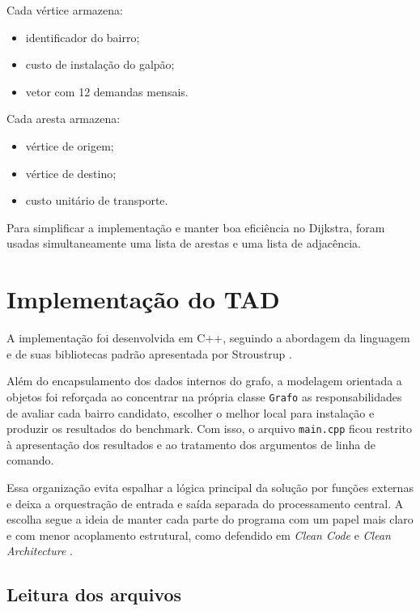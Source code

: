 \documentclass[12pt,a4paper]{article}
\begin{document}
Cada vértice armazena:

\begin{itemize}[noitemsep]
    \item identificador do bairro;
    \item custo de instalação do galpão;
    \item vetor com 12 demandas mensais.
\end{itemize}

Cada aresta armazena:

\begin{itemize}[noitemsep]
    \item vértice de origem;
    \item vértice de destino;
    \item custo unitário de transporte.
\end{itemize}

Para simplificar a implementação e manter boa eficiência no Dijkstra, foram
usadas simultaneamente uma lista de arestas e uma lista de adjacência.

\section{Implementação do TAD}

A implementação foi desenvolvida em C++, seguindo a abordagem da linguagem e de
suas bibliotecas padrão apresentada por Stroustrup \cite{stroustrup2013}.

Além do encapsulamento dos dados internos do grafo, a modelagem orientada a
objetos foi reforçada ao concentrar na própria classe \texttt{Grafo} as
responsabilidades de avaliar cada bairro candidato, escolher o melhor local
para instalação e produzir os resultados do benchmark. Com isso, o arquivo
\texttt{main.cpp} ficou restrito à apresentação dos resultados e ao tratamento
dos argumentos de linha de comando.

Essa organização evita espalhar a lógica principal da solução por funções
externas e deixa a orquestração de entrada e saída separada do processamento
central. A escolha segue a ideia de manter cada parte do programa com um papel
mais claro e com menor acoplamento estrutural, como defendido em
\textit{Clean Code} e \textit{Clean Architecture} \cite{martin2009,martin2018}.

\subsection{Leitura dos arquivos}
\end{document}
